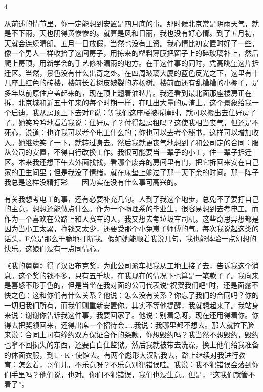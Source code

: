 4 

从前述的情节里，你一定能想到安置是四月底的事。那时候北京常是阴雨天气，就是不下雨，天也阴得黄惨惨的。就算是风和日丽，我也没有好心情。到了五月初，天就会连续晴朗。五月一日放假，当然也没有工资。我心情比初安置时好了一些，像一个男人一样收拾了这间房子，用拣来的塑料薄膜把窗子上的碎玻璃补上，然后爬上房顶，用新学会的手艺修补漏雨的地方。在干这件事的同时，凭高眺望这片拆迁区。当然，景色没有什么出奇之处。在四周玻璃大厦的蓝色反光之下，这里有十几座土红色的砖楼，楼前长着树皮皴裂的赤杨树。楼前面还有乱糟糟的小棚子，是多年以前原住户盖起来的，现在顶上翘着油毡片。我还看到最北面那座楼房正在拆，北京城和近五十年来的每个时期一样，在吐出大量的房渣土。这个景象给我一个启迪，我从房顶上下去对F说：等我们这座楼被拆掉时，就可以搬出去住好房子了。她笑吟吟地看着我说：住好房子？付得起房租吗？这使我相当丧气，但还是不死心，说道：也许我可以考个电工什么的；你也可以去考个秘书，这样可以增加收入。她继续笑了一下，就转过身去。然后我就更丧气地想到了和公司定的合同：服从公司的安置，不得自行改换工作。我很可能要当一辈子的小工，住一辈子拆迁区。本来我还想下午去外面找找，看哪个废弃的房间里有门，把它拆回来安在自己家的卫生间里；但是我没了情绪，就在床垫上躺过了那一天下余的时间。那一阵子我总是这样没精打彩——因为实在没有什么事可高兴的。 

有关我想考电工的事，还有必要补充几句。人到了我这个地步，总免不了要打自己的主意，想想还能做点什么。作为一个物理系的毕业生，很容易想到去考电工。而作为一个喜欢在公路上和人赛车的人，我又想去考垃圾车司机。这些奇思异想都是因为当小工太累，挣钱又太少，还要受那个小兔崽子师傅的气。每次我说起这类的话头，F总是那么干脆地打断我。假如她能顺着我说几句，我也能体验一点幻想的快乐。这娘们没有一点同情心。 

《我的舅舅》得了汉语布克奖，为此公司派车把我从工地上接了去，告诉我这个消息。这个奖的钱不多，只有五千块，在我现在的情况下也算是一笔款子了。我向来是喜怒不形于色的，但是当坐在我对面的公司代表说“祝贺我们吧”时，还是面露不快之色：这和你们有什么关系？他说：怎么没有关系？你忘了我们的合同吗？你的一切归我们所有，而我们则重新安置你。其实不等他提醒，我就想起来了。我站身来说：谢谢你告诉我这件事，我要回家了。他说：别着急呀，现在还用得着你。你得去把奖领回来，还得出席一个招待会……我说：我哪里都不想去。那人就拉下脸来说：合同上可有缔约双方保证合作的条款，你想毁约吗？我当然不想毁约，毁约也拿不回损失的东西，还要白白住监狱。然后我就被带去洗澡，换上他们给我准备的体面衣服，到U·K·使馆去。有两个彪形大汉陪我去，路上继续对我进行教育：怎么着，哥们儿，不乐意呀？不乐意别犯错误哇。我说：我不犯错误会落到你们手里吗？他们说，也对。你们不犯错误，我们也没生意。但是，“这我们就管不着了”。 


